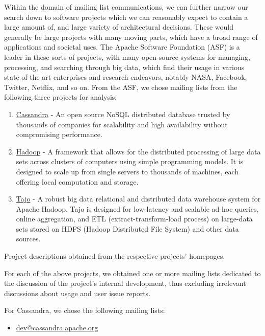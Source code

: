 \documentclass[a4paper, 12pt]{article}
\begin{document}
		Within the domain of mailing list communications, we can further narrow our search down to software projects which we can reasonably expect to contain a large amount of, and large variety of architectural decisions. These would generally be large projects with many moving parts, which have a broad range of applications and societal uses. The Apache Software Foundation (ASF) is a leader in these sorts of projects, with many open-source systems for managing, processing, and searching through big data, which find their usage in various state-of-the-art enterprises and research endeavors, notably NASA, Facebook, Twitter, Netflix, and so on\cite{akhtar}. From the ASF, we chose mailing lists from the following three projects for analysis:
		
		\begin{enumerate}
			\item \href{https://cassandra.apache.org}{Cassandra} - An open source NoSQL distributed database trusted by thousands of companies for scalability and high availability without compromising performance.
			\item \href{https://hadoop.apache.org/}{Hadoop} - A framework that allows for the distributed processing of large data sets across clusters of computers using simple programming models. It is designed to scale up from single servers to thousands of machines, each offering local computation and storage.
			\item \href{https://tajo.apache.org/}{Tajo} - A robust big data relational and distributed data warehouse system for Apache Hadoop. Tajo is designed for low-latency and scalable ad-hoc queries, online aggregation, and ETL (extract-transform-load process) on large-data sets stored on HDFS (Hadoop Distributed File System) and other data sources.
		\end{enumerate}
		
		\footnotesize Project descriptions obtained from the respective projects' homepages.
		\normalsize
		
		For each of the above projects, we obtained one or more mailing lists dedicated to the discussion of the project's internal development, thus excluding irrelevant discussions about usage and user issue reports.
		
		For Cassandra, we chose the following mailing lists:
		\begin{itemize}
			\item \href{https://lists.apache.org/list.html?dev@cassandra.apache.org}{dev@cassandra.apache.org}
		\end{itemize}
	
\end{document}

